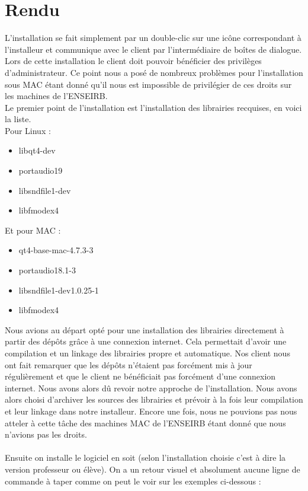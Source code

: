\section{Rendu}
L'installation se fait simplement par un double-clic sur une icône correspondant à l'installeur et
communique avec le client par l'intermédiaire de boîtes de dialogue. Lors de cette installation
le client doit pouvoir bénéficier des privilèges d'administrateur. Ce point nous a posé de nombreux
problèmes pour l'installation sous MAC étant donné qu'il nous est impossible de privilégier de ces
droits sur les machines de l'ENSEIRB.\\
Le premier point de l'installation est l'installation des librairies recquises, en voici la liste.\\
Pour Linux :
\begin{itemize}
 \item libqt4-dev
 \item portaudio19
 \item libsndfile1-dev
 \item libfmodex4
\end{itemize}
Et pour MAC :
\begin{itemize}
 \item qt4-base-mac-4.7.3-3
 \item portaudio18.1-3
 \item libsndfile1-dev1.0.25-1
 \item libfmodex4
\end{itemize}
Nous avions au départ opté pour une installation des librairies directement à partir des dépôts grâce
à une connexion internet. Cela permettait d'avoir une compilation et un linkage des librairies propre
et automatique. Nos client nous ont fait remarquer que les dépôts n'étaient pas forcément mis à jour régulièrement
et que le client ne bénéficiait pas forcément d'une connexion internet. Nous avons alors dû revoir
notre approche de l'installation. Nous avons alors choisi d'archiver les sources des librairies et prévoir
à la fois leur compilation et leur linkage dans notre installeur. Encore une fois, nous ne pouvions
pas nous atteler à cette tâche des machines MAC de l'ENSEIRB étant donné que nous n'avions pas les 
droits.\\
\\
Ensuite on installe le logiciel en soit (selon l'installation choisie c'est à dire la version
professeur ou élève). On a un retour visuel et absolument aucune ligne de commande à taper comme
on peut le voir sur les exemples ci-dessous :

